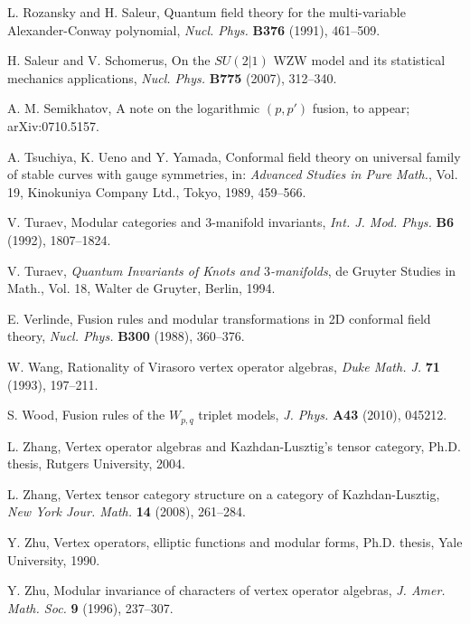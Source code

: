 \documentclass[12pt]{article}
\begin{document}
\begin{thebibliography}{FGST2}
L. Rozansky and H. Saleur, Quantum field theory for the multi-variable
Alexander-Conway polynomial, {\it Nucl. Phys.} {\bf B376} (1991),
461--509.

H. Saleur and V. Schomerus, On the $SU(2|1)$ WZW model and its
statistical mechanics applications, {\it Nucl. Phys.} {\bf B775}
(2007), 312--340.

A. M. Semikhatov, A note on the logarithmic $(p, p')$ fusion, to appear; 
arXiv:0710.5157.

A. Tsuchiya, K. Ueno and Y. Yamada, Conformal field theory on
universal
family of stable curves with gauge symmetries, in: {\em Advanced
  Studies in
Pure Math.}, Vol. 19, Kinokuniya Company Ltd.,
Tokyo, 1989, 459--566.

V.  Turaev, Modular categories and $3$-manifold invariants,
{\it Int. J. Mod. Phys.} {\bf B6} (1992), 1807--1824.

V.  Turaev, {\em Quantum Invariants of Knots and $3$-manifolds},
de Gruyter Studies in Math., Vol. 18,
Walter de Gruyter, Berlin, 1994.

E. Verlinde, 
Fusion rules and modular transformations in 2D conformal field theory, 
{\em Nucl. Phys.} {\bf B300} (1988), 360--376.

W. Wang, Rationality of Virasoro vertex operator
algebras, {\it Duke Math. J.} {\bf 71} (1993), 197--211.

S. Wood, Fusion rules of the $W_{p,q}$ triplet models, {\it J. Phys.} {\bf A43} (2010),
045212.

L. Zhang, Vertex operator algebras and Kazhdan-Lusztig's tensor 
category, Ph.D. thesis, Rutgers University, 2004.

 L. Zhang, Vertex tensor category structure on a
category of Kazhdan-Lusztig, {\it New York Jour. Math.} {\bf 14}
(2008), 261--284.

Y. Zhu, Vertex operators, elliptic functions and
modular forms, Ph.D. thesis, Yale University, 1990.

Y. Zhu, Modular invariance of characters of vertex operator algebras,
{\em J.
Amer. Math. Soc.} {\bf 9} (1996), 237--307.



\end{thebibliography}

\bigskip
\end{document}
